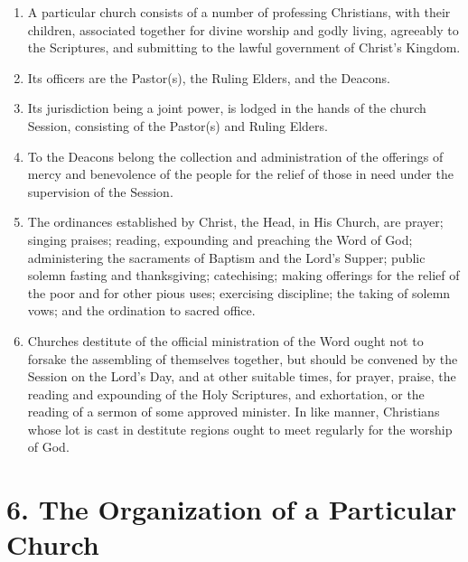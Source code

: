\documentclass[
]{book}
\providecommand{\tightlist}{%
  \setlength{\itemsep}{0pt}\setlength{\parskip}{0pt}}
\begin{document}
\protect\hypertarget{chapter-slug-5-the-particular-church}{\href{}{}}

\begin{enumerate}
\def\labelenumi{\arabic{enumi}.}
\tightlist
\item
  \protect\hypertarget{5.1}{\href{}{}}A particular church consists of a number of professing Christians, with their children, associated together for divine worship and godly living, agreeably to the Scriptures, and submitting to the lawful government of Christ's Kingdom.
\item
  Its officers are the Pastor(s), the Ruling Elders, and the Deacons.
\item
  Its jurisdiction being a joint power, is lodged in the hands of the church Session, consisting of the Pastor(s) and Ruling Elders.
\item
  To the Deacons belong the collection and administration of the offerings of mercy and benevolence of the people for the relief of those in need under the supervision of the Session.
\item
  The ordinances established by Christ, the Head, in His Church, are prayer; singing praises; reading, expounding and preaching the Word of God; administering the sacraments of Baptism and the Lord's Supper; public solemn fasting and thanksgiving; catechising; making offerings for the relief of the poor and for other pious uses; exercising discipline; the taking of solemn vows; and the ordination to sacred office.
\item
  Churches destitute of the official ministration of the Word ought not to forsake the assembling of themselves together, but should be convened by the Session on the Lord's Day, and at other suitable times, for prayer, praise, the reading and expounding of the Holy Scriptures, and exhortation, or the reading of a sermon of some approved minister. In like manner, Christians whose lot is cast in destitute regions ought to meet regularly for the worship of God.
\end{enumerate}

\hypertarget{the-organization-of-a-particular-church}{%
\section*{6. The Organization of a Particular Church}\label{the-organization-of-a-particular-church}}

\protect\hypertarget{chapter-slug-6-the-organization-of-a-particular-church}{\href{}{}}
\end{document}
